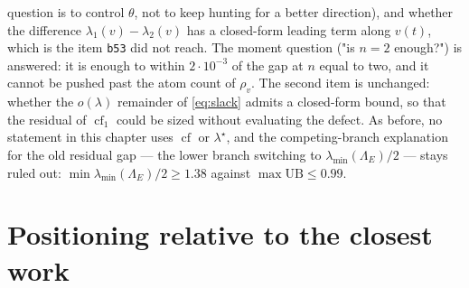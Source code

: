 \documentclass[11pt]{article}
\theoremstyle{remark}
\newcommand{\Le}{\Lambda_E}
\begin{document}
\begin{enumerate}
question is to control $\theta$, not to keep hunting for a better direction), and
whether the difference $\lambda_1(v)-\lambda_2(v)$ has a closed-form leading term along $v(t)$, which
is the item \texttt{b53} did not reach. The moment question
("is $n=2$ enough?") is answered: it is enough to within $2\cdot10^{-3}$ of the gap at $n$ equal to
two, and it cannot be pushed past the atom count of $\rho_v$. The
second item is unchanged: whether the $o(\lambda)$ remainder of \eqref{eq:slack} admits a
closed-form bound, so that the residual
of $\operatorname{cf}_{1}$ could be sized without evaluating the defect. As before, no statement in
this chapter uses
$\operatorname{cf}$ or $\lambda^{\star}$, and the competing-branch explanation for the old residual
gap --- the lower branch switching to $\lambda_{\min}(\Le)/2$ --- stays ruled out:
$\min\lambda_{\min}(\Le)/2\ge1.38$ against $\max\mathrm{UB}\le0.99$.
\end{enumerate}

\section{Positioning relative to the closest work}\label{sec:position}
\end{document}
